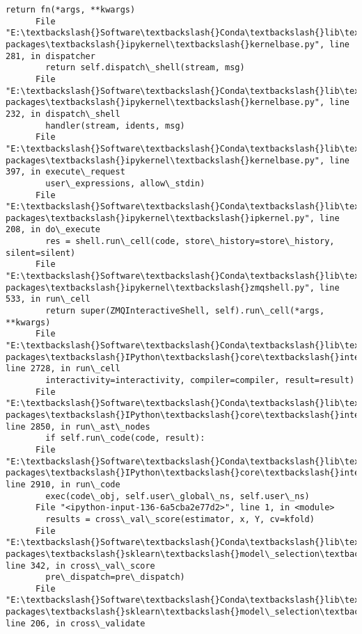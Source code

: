 \documentclass[11pt]{article}
\begin{document}
\begin{Verbatim}[commandchars=\\\{\}]
        return fn(*args, **kwargs)
      File "E:\textbackslash{}Software\textbackslash{}Conda\textbackslash{}lib\textbackslash{}site-packages\textbackslash{}ipykernel\textbackslash{}kernelbase.py", line 281, in dispatcher
        return self.dispatch\_shell(stream, msg)
      File "E:\textbackslash{}Software\textbackslash{}Conda\textbackslash{}lib\textbackslash{}site-packages\textbackslash{}ipykernel\textbackslash{}kernelbase.py", line 232, in dispatch\_shell
        handler(stream, idents, msg)
      File "E:\textbackslash{}Software\textbackslash{}Conda\textbackslash{}lib\textbackslash{}site-packages\textbackslash{}ipykernel\textbackslash{}kernelbase.py", line 397, in execute\_request
        user\_expressions, allow\_stdin)
      File "E:\textbackslash{}Software\textbackslash{}Conda\textbackslash{}lib\textbackslash{}site-packages\textbackslash{}ipykernel\textbackslash{}ipkernel.py", line 208, in do\_execute
        res = shell.run\_cell(code, store\_history=store\_history, silent=silent)
      File "E:\textbackslash{}Software\textbackslash{}Conda\textbackslash{}lib\textbackslash{}site-packages\textbackslash{}ipykernel\textbackslash{}zmqshell.py", line 533, in run\_cell
        return super(ZMQInteractiveShell, self).run\_cell(*args, **kwargs)
      File "E:\textbackslash{}Software\textbackslash{}Conda\textbackslash{}lib\textbackslash{}site-packages\textbackslash{}IPython\textbackslash{}core\textbackslash{}interactiveshell.py", line 2728, in run\_cell
        interactivity=interactivity, compiler=compiler, result=result)
      File "E:\textbackslash{}Software\textbackslash{}Conda\textbackslash{}lib\textbackslash{}site-packages\textbackslash{}IPython\textbackslash{}core\textbackslash{}interactiveshell.py", line 2850, in run\_ast\_nodes
        if self.run\_code(code, result):
      File "E:\textbackslash{}Software\textbackslash{}Conda\textbackslash{}lib\textbackslash{}site-packages\textbackslash{}IPython\textbackslash{}core\textbackslash{}interactiveshell.py", line 2910, in run\_code
        exec(code\_obj, self.user\_global\_ns, self.user\_ns)
      File "<ipython-input-136-6a5cba2e77d2>", line 1, in <module>
        results = cross\_val\_score(estimator, x, Y, cv=kfold)
      File "E:\textbackslash{}Software\textbackslash{}Conda\textbackslash{}lib\textbackslash{}site-packages\textbackslash{}sklearn\textbackslash{}model\_selection\textbackslash{}\_validation.py", line 342, in cross\_val\_score
        pre\_dispatch=pre\_dispatch)
      File "E:\textbackslash{}Software\textbackslash{}Conda\textbackslash{}lib\textbackslash{}site-packages\textbackslash{}sklearn\textbackslash{}model\_selection\textbackslash{}\_validation.py", line 206, in cross\_validate

\end{Verbatim}
\end{document}
